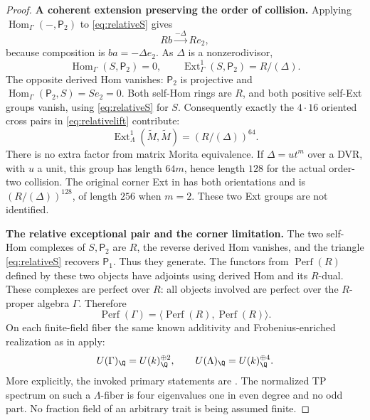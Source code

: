 \begin{proof}
\par\smallskip\noindent\textbf{A coherent extension preserving the order of collision.}\quad
Applying $\operatorname{Hom}_\Gamma(-,\mathsf P_2)$ to
\eqref{eq:relativeS} gives
\[
 Rb\xrightarrow{-\Delta}Re_2,
\]
because composition is $ba=-\Delta e_2$.
As $\Delta$ is a nonzerodivisor,
\[
 \operatorname{Hom}_\Gamma(S,\mathsf P_2)=0,\qquad
 \operatorname{Ext}^1_\Gamma(S,\mathsf P_2)=R/(\Delta).
\]
The opposite derived Hom vanishes:
$\mathsf P_2$ is projective and
$\operatorname{Hom}_\Gamma(\mathsf P_2,S)=Se_2=0$.
Both self-Hom rings are $R$, and both positive self-Ext
groups vanish, using \eqref{eq:relativeS} for $S$.
Consequently exactly the $4\cdot16$ oriented cross
pairs in \eqref{eq:relativelift} contribute:
\[
 \operatorname{Ext}^1_\Lambda(\widetilde M,\widetilde M)
       =(R/(\Delta))^{64}.
\]
There is no extra factor from matrix Morita equivalence.
If $\Delta=ut^m$ over a DVR, with $u$ a unit, this
group has length $64m$, hence length $128$ for the actual
order-two collision. The original corner Ext in 
has both orientations and is $(R/(\Delta))^{128}$,
of length $256$ when $m=2$. These two Ext groups are
not identified.

\par\smallskip\noindent\textbf{The relative exceptional pair and the corner limitation.}\quad
The two self-Hom complexes of $S,\mathsf P_2$ are $R$,
the reverse derived Hom vanishes, and the triangle
\eqref{eq:relativeS} recovers $\mathsf P_1$. Thus they
generate. The functors from $\operatorname{Perf}(R)$
defined by these two objects have adjoints using derived
Hom and its $R$-dual. These complexes are perfect over
$R$: all objects involved are perfect over the
$R$-proper algebra $\Gamma$. Therefore
\[
 \operatorname{Perf}(\Gamma)
       =\langle\operatorname{Perf}(R),\operatorname{Perf}(R)\rangle.
\]
On each finite-field fiber the same known additivity and
Frobenius-enriched realization as in  apply:
\[
 U(\Gamma)_{\Q}=U(k)_{\Q}^{\oplus2},\qquad
 U(\Lambda)_{\Q}=U(k)_{\Q}^{\oplus4}.
\]
More explicitly, the invoked primary statements are
\cite[Example~12.3, p.~24; \S6.2, equation~(6.9), p.~16;
\S7, equations~(7.1)--(7.4), p.~17]{TabuadaWeil}.
The normalized TP spectrum on such a $\Lambda$-fiber
is four eigenvalues one in even degree and no odd part.
No fraction field of an arbitrary trait is being assumed
finite.


\end{proof}
